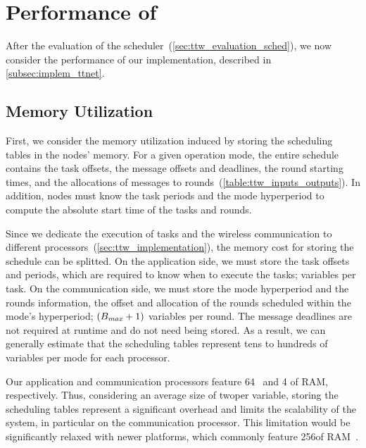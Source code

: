 \vspace{-10pt}
\section{Performance of \TTnet}
\label{sec:ttw_evaluation_implem}

After the evaluation of the \TTW scheduler~(\cref{sec:ttw_evaluation_sched}), we now consider the performance of our \TTnet implementation, described in \cref{subsec:implem_ttnet}.

\subsection{Memory Utilization}

First, we consider the memory utilization induced by storing the scheduling tables in the nodes' memory.
For a given operation mode, the entire schedule contains the task offsets, the message offsets and deadlines, the round starting times, and the allocations of messages to rounds~(\cref{table:ttw_inputs_outputs}).
In addition, nodes must know the task periods and the mode hyperperiod to compute the absolute start time of the tasks and rounds.

Since we dedicate the execution of tasks and the wireless communication to different processors~(\cref{sec:ttw_implementation}), the memory cost for storing the schedule can be splitted.
On the application side, we must store the task offsets and periods, which are required to know when to execute the tasks;  variables per task.
On the communication side, we must store the mode hyperperiod and the rounds information, \ie the offset and allocation of the rounds scheduled within the mode's hyperperiod; \ie $(B_{\mathit{max}}+1)$ variables per round.
The message deadlines are not required at runtime and do not need being stored.
As a result, we can generally estimate that the scheduling tables represent tens to hundreds of variables per mode for each processor.

Our application and communication processors feature 64\kB~\cite{msp432} and 4\kB\cite{CC430F6137} of RAM, respectively. Thus, considering an average size of two\bytes per variable, storing the scheduling tables represent a significant overhead and limits the scalability of the system, in particular on the communication processor.
This limitation would be significantly relaxed with newer platforms, which commonly feature 256\kB of RAM~\cite{nRF52840}.

